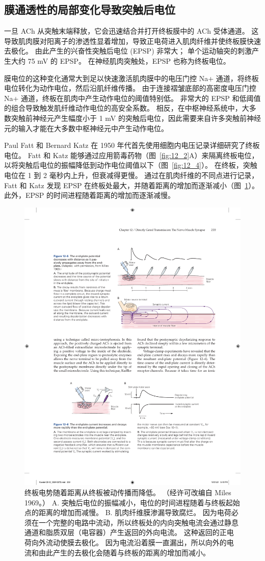\subsection{膜通透性的局部变化导致突触后电位}

一旦 ACh 从突触末端释放，它会迅速结合并打开终板膜中的 ACh 受体通道。
这导致肌肉膜对阳离子的渗透性显着增加，导致正电荷进入肌肉纤维并使终板膜快速去极化。
由此产生的兴奋性突触后电位 (EPSP) 非常大；
单个运动轴突的刺激产生大约 75 mV 的 EPSP。
在神经肌肉突触处，EPSP 也称为终板电位。


膜电位的这种变化通常大到足以快速激活肌肉膜中的电压门控 Na+ 通道，将终板电位转化为动作电位，然后沿肌纤维传播。
由于连接褶皱底部的高密度电压门控 Na+ 通道，终板在肌肉中产生动作电位的阈值特别低。
非常大的 EPSP 和低阈值的组合导致触发肌纤维动作电位的高安全系数。
相反，在中枢神经系统中，大多数突触前神经元产生幅度小于 1 mV 的突触后电位，因此需要来自许多突触前神经元的输入才能在大多数中枢神经元中产生动作电位。


Paul Fatt 和 Bernard Katz 在 1950 年代首先使用细胞内电压记录详细研究了终板电位。
Fatt 和 Katz 能够通过应用箭毒药物（图~\ref{fig:12_2}A）来隔离终板电位，以将突触后电位的振幅降低到动作电位阈值以下（图~\ref{fig:12_4}）。
在终板，突触电位在 1 到 2 毫秒内上升，但衰减得更慢。
通过在肌肉纤维的不同点进行记录，Fatt 和 Katz 发现 EPSP 在终板处最大，并随着距离的增加而逐渐减小（图~\ref{fig:12_5}）。
此外，EPSP 的时间进程随着距离的增加而逐渐减慢。


\begin{figure}[htbp]
	\centering
	\includegraphics[width=0.6\linewidth]{chap12/fig_12_5}
	\caption{终板电势随着距离从终板被动传播而降低。 （经许可改编自 Miles 1969。） 
		A. 突触后电位的振幅减小，电位的时间进程随着与终板起始点的距离的增加而减慢。 
		B. 肌肉纤维膜渗漏导致腐烂。 
		因为电荷必须在一个完整的电路中流动，所以终板处的内向突触电流会通过静息通道和脂质双层（电容器）产生返回的外向电流。 
		这种返回的正电荷向外流动使膜去极化。 
		因为电流沿着膜一直漏出，所以向外的电流和由此产生的去极化会随着与终板的距离的增加而减小。}
	\label{fig:12_5}
\end{figure}


